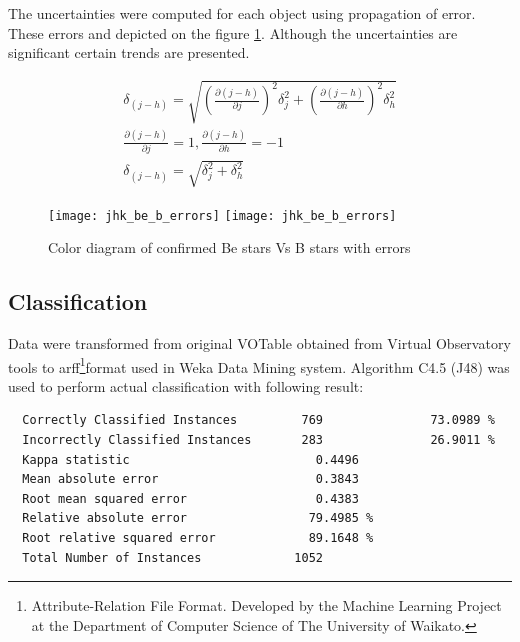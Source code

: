     The uncertainties were computed for each object using propagation
    of error. These errors and depicted on the figure
    \ref{Figjhk_be_b_errors}. Although the uncertainties are
    significant certain trends are presented.

\begin{align*}
  \delta_{(j - h)} = \sqrt{\left(\frac{\partial(j - h) }{\partial
        j}\right)^2\delta_j^2 + \left(\frac{\partial(j - h) }{\partial
        h}\right)^2\delta_h^2} \\
  \frac{\partial(j - h) }{\partial j } = 1,\frac{\partial(j - h)
  }{\partial h } = -1 \\
  \delta_{(j - h)} = \sqrt{\delta_j^2 + \delta_h^2}
\end{align*}


    \begin{figure}[!htbp]
      \begin{center}
        \leavevmode
        \ifpdf
        \texttt{[image: jhk\_be\_b\_errors]}
        \else
        \texttt{[image: jhk\_be\_b\_errors]}
        \fi
        \caption{Color diagram of confirmed Be stars Vs B stars with errors}
        \label{Figjhk_be_b_errors}
      \end{center}
    \end{figure}

\clearpage


\subsection{Classification}
Data were transformed from original VOTable obtained from Virtual
Observatory tools to arff\footnote{Attribute-Relation File
  Format. Developed by the Machine Learning Project at the Department
  of Computer Science of The University of Waikato.}format used in
Weka Data Mining system. Algorithm C4.5 (J48) was used to perform
actual classification with following result:

\begin{lstlisting}
  Correctly Classified Instances         769               73.0989 %
  Incorrectly Classified Instances       283               26.9011 %
  Kappa statistic                          0.4496
  Mean absolute error                      0.3843
  Root mean squared error                  0.4383
  Relative absolute error                 79.4985 %
  Root relative squared error             89.1648 %
  Total Number of Instances             1052
\end{lstlisting}

